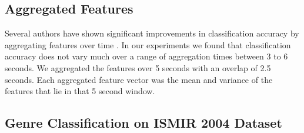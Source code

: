 \documentclass{article}
\begin{document}
\vspace{-0.5em}
\subsection{Aggregated Features}

Several authors have shown significant improvements in classification accuracy by aggregating features over time \cite{bergstra2006aggregate,hamel2010learning,bergstra2010scalable,tzanetakis2002musical}.
In our experiments we found that classification accuracy does not vary much over a range of aggregation times between 3 to 6 seconds. We aggregated the features over 5 seconds with an overlap of 2.5 seconds. Each aggregated feature vector was the mean and variance of the features that lie in that 5 second window. 

\subsection{Genre Classification on ISMIR 2004 Dataset}
\end{document}
